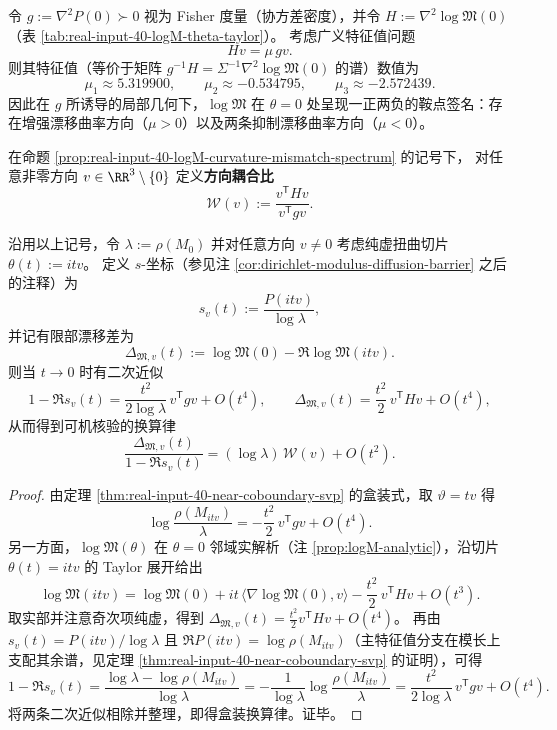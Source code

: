 \begin{proposition}\label{prop:real-input-40-logM-curvature-mismatch-spectrum}
令 \(g:=\nabla^2P(0)\succ 0\) 视为 Fisher 度量（协方差密度），并令 \(H:=\nabla^2\log\mathfrak{M}(0)\)（表 \ref{tab:real-input-40-logM-theta-taylor}）。
考虑广义特征值问题
\[
Hv=\mu\,gv.
\]
则其特征值（等价于矩阵 \(g^{-1}H=\Sigma^{-1}\nabla^2\log\mathfrak{M}(0)\) 的谱）数值为
\[
\mu_1\approx 5.319900,\qquad
\mu_2\approx -0.534795,\qquad
\mu_3\approx -2.572439.
\]
因此在 \(g\) 所诱导的局部几何下，\(\log\mathfrak{M}\) 在 \(\theta=0\) 处呈现一正两负的鞍点签名：存在增强漂移曲率方向（\(\mu>0\)）以及两条抑制漂移曲率方向（\(\mu<0\)）。
\end{proposition}

\begin{definition}\label{def:real-input-40-directional-coupling}
在命题 \ref{prop:real-input-40-logM-curvature-mismatch-spectrum} 的记号下，
对任意非零方向 \(v\in\RR^3\setminus\{0\}\) 定义\textbf{方向耦合比}
\[
\mathcal{W}(v):=\frac{v^{\mathsf T}Hv}{v^{\mathsf T}gv}.
\]
\end{definition}

\begin{proposition}\label{prop:real-input-40-space-time-conversion-law}
沿用以上记号，令 \(\lambda:=\rho(M_0)\) 并对任意方向 \(v\neq 0\) 考虑纯虚扭曲切片
\(
\theta(t):=i t v
\)。
定义 \(s\)-坐标（参见注 \ref{cor:dirichlet-modulus-diffusion-barrier} 之后的注释）为
\[
s_v(t):=\frac{P(itv)}{\log\lambda},
\]
并记有限部漂移差为
\[
\Delta_{\mathfrak{M},v}(t)
:=\log\mathfrak{M}(0)-\Re\log\mathfrak{M}(itv).
\]
则当 \(t\to 0\) 时有二次近似
\[
1-\Re s_v(t)=\frac{t^2}{2\log\lambda}\,v^{\mathsf T}gv+O(t^4),
\qquad
\Delta_{\mathfrak{M},v}(t)=\frac{t^2}{2}\,v^{\mathsf T}Hv+O(t^4),
\]
从而得到可机核验的换算律
\[
\boxed{\;
\frac{\Delta_{\mathfrak{M},v}(t)}{1-\Re s_v(t)}
=(\log\lambda)\,\mathcal{W}(v)+O(t^2).\;}
\]
\end{proposition}
\begin{proof}
由定理 \ref{thm:real-input-40-near-coboundary-svp} 的盒装式，取 \(\vartheta=t v\) 得
\[
\log\frac{\rho(M_{itv})}{\lambda}
=-\frac{t^2}{2}\,v^{\mathsf T}gv+O(t^4).
\]
另一方面，\(\log\mathfrak{M}(\theta)\) 在 \(\theta=0\) 邻域实解析（注 \ref{prop:logM-analytic}），沿切片 \(\theta(t)=itv\) 的 Taylor 展开给出
\[
\log\mathfrak{M}(itv)
=\log\mathfrak{M}(0)+it\,\langle\nabla\log\mathfrak{M}(0),v\rangle-\frac{t^2}{2}\,v^{\mathsf T}Hv+O(t^3).
\]
取实部并注意奇次项纯虚，得到
\(
\Delta_{\mathfrak{M},v}(t)=\frac{t^2}{2}v^{\mathsf T}Hv+O(t^4)
\)。
再由 \(s_v(t)=P(itv)/\log\lambda\) 且 \(\Re P(itv)=\log\rho(M_{itv})\)（主特征值分支在模长上支配其余谱，见定理 \ref{thm:real-input-40-near-coboundary-svp} 的证明），可得
\[
1-\Re s_v(t)
=\frac{\log\lambda-\log\rho(M_{itv})}{\log\lambda}
=-\frac{1}{\log\lambda}\log\frac{\rho(M_{itv})}{\lambda}
=\frac{t^2}{2\log\lambda}\,v^{\mathsf T}gv+O(t^4).
\]
将两条二次近似相除并整理，即得盒装换算律。证毕。
\end{proof}

